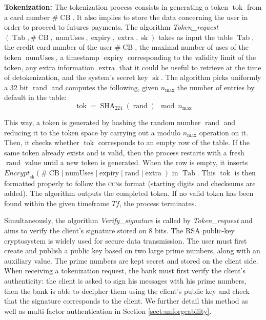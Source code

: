 \documentclass{llncs}
\DeclareMathOperator{\numUses}{numUses}
\DeclareMathOperator{\Tab}{Tab}
\DeclareMathOperator{\CB}{CB}
\DeclareMathOperator{\expiry}{expiry}
\DeclareMathOperator{\extra}{extra}
\DeclareMathOperator{\rand}{rand}
\DeclareMathOperator{\sk}{sk}
\DeclareMathOperator{\SHA}{SHA}
\DeclareMathOperator{\tok}{tok}
\begin{document}
\textbf{Tokenization:} The tokenization process consists in generating a token $\tok$ from a card number $\#\CB$. It also implies to store the data concerning the user in order to proceed to futures payments. The algorithm \textit{Token\_request}$(\Tab, \#\CB , \numUses, \expiry, \extra, \sk)$ takes as input the table $\Tab$, the credit card number of the user $\#\CB$, the maximal number of uses of the token $\numUses$, a timestamp $\expiry$ corresponding to the validity limit of the token, any extra information $\extra$ that it could be useful to retrieve at the time of detokenization, and the system's secret key $\sk$. The algorithm picks uniformly a 32 bit $\rand$ and computes the following, given $n_{\max}$ the number of entries by default in the table: 
$$\tok = \SHA_{224}(\rand) \mod n_{\max} $$

This way, a token is generated by hashing the random number $\rand$ and reducing it to the token space by carrying out a modulo $n_{\max}$ operation on it. Then, it checks whether $\tok$ corresponds to an empty row of the table. If the same token already exists and is valid, then the process restarts with a fresh $\rand$ value until a new token is generated. When the row is empty, it inserts $\textit{Encrypt}_{\sk} (\#\CB | \numUses | \expiry | \rand | \extra)$ in $\Tab$. This $\tok$ is then formatted properly to follow the \textsc{ccn}s format (starting digits and checksums are added). The algorithm outputs the completed token. If no valid token has been found within the given timeframe $Tf$, the process terminates.

Simultaneously, the algorithm \textit{Verify\_signature} is called by \textit{Token\_request} and aims to verify the client's signature stored on 8 bits. The RSA public-key cryptosystem is widely used for secure data transmission. The user must first create and publish a public key based on two large prime numbers, along with an auxiliary value. The prime numbers are kept secret and stored on the client side. When receiving a tokenization request, the bank must first verify the client's authenticity: the client is asked to sign his messages with his prime numbers, then the bank is able to decipher them using the client's public key and check that the signature corresponds to the client. We further detail this method as well as multi-factor authentication in Section \ref{sect:unforgeability}.
\end{document}
